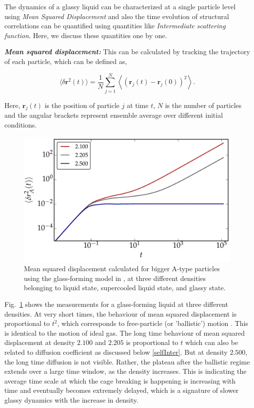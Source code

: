     The dynamics of a glassy liquid can be characterized at a single particle level using {\em Mean Squared Displacement} and also the time evolution of structural correlations can be quantified using quantities like {\em Intermediate scattering function}. Here, we discuss these quantities one by one.
    
    {\bf \em Mean squared displacement:} This can be calculated by tracking the trajectory of each particle, which can be defined as,
    
    \begin{equation}
        \langle \delta \textbf{r}^2(t)\rangle = \frac{1}{N}  \sum_{j=1}^{N} \left\langle \left(\textbf{r}_j(t) - \textbf{r}_j(0) \right)^2 \right\rangle.
    \end{equation}
    
    Here, $\textbf{r}_j(t)$ is the position of particle $j$ at time $t$, $N$ is the number of particles and the angular brackets represent ensemble average over different initial conditions.
    
    \begin{figure}[hbt!]
	\includegraphics[width=14cm]{figs/fig_msd.pdf}
	\centering
	\caption[{\em Mean squared displacement}]{Mean squared displacement calculated for bigger A-type particles using the glass-forming model in \cite{vaibhav2022finite}, at three different densities belonging to liquid state, supercooled liquid state, and glassy state.\label{fig_msd}}
    \end{figure}
    
    Fig.~\ref{fig_msd} shows the measurements for a glass-forming liquid at three different densities.  At very short times, the behaviour of mean squared displacement is proportional to $t^2$, which corresponds to free-particle (or 'ballistic') motion \cite{hansen2013,frenkel2001understanding}. This is identical to the motion of ideal gas. The long time behaviour of mean squared displacement at density $2.100$ and $2.205$ is proportional to $t$ which can also be related to diffusion coefficient as discussed below \ref{selfInter}. But at density $2.500$, the long time diffusion is not visible. Rather, the plateau after the ballistic regime extends over a large time window, as the density increases. This is indicating the average time scale at which the cage breaking is happening is increasing with time and eventually becomes extremely delayed, which is a signature of slower glassy dynamics with the increase in density.

